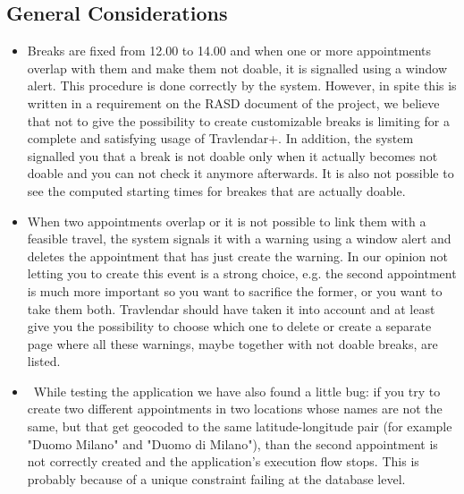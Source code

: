\subsection{General Considerations}
\begin{itemize}
	\item Breaks are fixed from 12.00 to 14.00 and when one or more appointments overlap with them and make them not doable, it is signalled using a window alert. This procedure is done correctly by the system. However, in spite this is written in a requirement on the RASD document of the project, we believe that not to give the possibility to create customizable breaks is limiting for a complete and satisfying usage of Travlendar+. In addition, the system signalled you that a break is not doable only when it actually becomes not doable and you can not check it anymore afterwards. It is also not possible to see the computed starting times for breakes that are actually doable.
	\item When two appointments overlap or it is not possible to link them with a feasible travel, the system signals it with a warning using a window alert and deletes the appointment that has just create the warning. In our opinion not letting you to create this event is a strong choice, e.g. the second appointment is much more important so you want to sacrifice the former, or you want to take them both. Travlendar should have taken it into account and at least give you the possibility to choose which one to delete or create a separate page where all these warnings, maybe together with not doable breaks, are listed.
	\item~While testing the application we have also found a little bug: if you try to create two different appointments in two locations whose names are not the same, but that get geocoded to the same latitude-longitude pair (for example "Duomo Milano" and "Duomo di Milano"), than the second appointment is not correctly created and the application's execution flow stops. This is probably because of a unique constraint failing at the database level.
\end{itemize}
